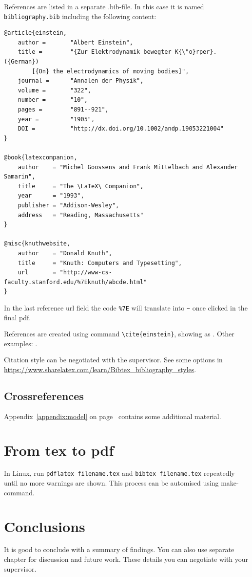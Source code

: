 References are listed in a separate .bib-file. In this case it is named \texttt{bibliography.bib} including the following content:
\begin{verbatim}
@article{einstein,
    author =       "Albert Einstein",
    title =        "{Zur Elektrodynamik bewegter K{\"o}rper}. ({German})
        [{On} the electrodynamics of moving bodies]",
    journal =      "Annalen der Physik",
    volume =       "322",
    number =       "10",
    pages =        "891--921",
    year =         "1905",
    DOI =          "http://dx.doi.org/10.1002/andp.19053221004"
}
 
@book{latexcompanion,
    author    = "Michel Goossens and Frank Mittelbach and Alexander Samarin",
    title     = "The \LaTeX\ Companion",
    year      = "1993",
    publisher = "Addison-Wesley",
    address   = "Reading, Massachusetts"
}
 
@misc{knuthwebsite,
    author    = "Donald Knuth",
    title     = "Knuth: Computers and Typesetting",
    url       = "http://www-cs-faculty.stanford.edu/%7Eknuth/abcde.html"
}
\end{verbatim}

In the last reference url field the code \verb+%7E+ will translate into \verb+~+ once clicked in the final pdf.

References are created using command \texttt{\textbackslash cite\{einstein\}}, showing as \citep{einstein}. Other examples: \citep{latexcompanion,knuthwebsite}.

Citation style can be negotiated with the supervisor. See some options in \url{https://www.sharelatex.com/learn/Bibtex_bibliography_styles}.

\section{Crossreferences}

Appendix~\ref{appendix:model} on page~\pageref{appendix:model} contains some additional material.

\chapter{From tex to pdf}

In Linux, run \texttt{pdflatex filename.tex} and \texttt{bibtex filename.tex} repeatedly until no more warnings are shown. This process can be automised using make-command.
 
\chapter{Conclusions\label{chapter:conclusions}}

It is good to conclude with a summary of findings. You can also use separate chapter for discussion and future work. These details you can negotiate with your supervisor.

